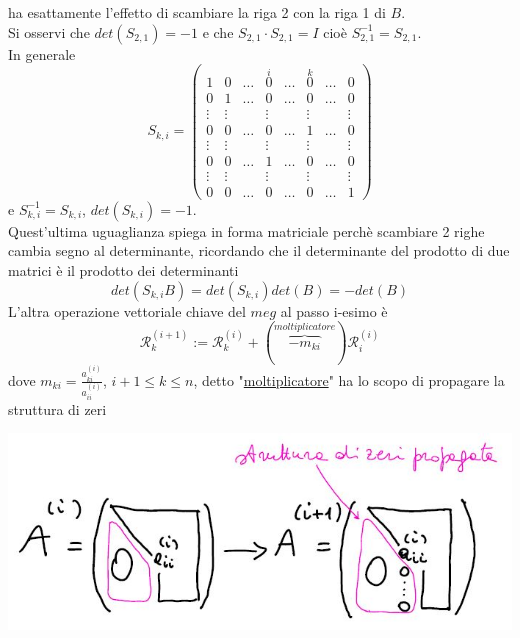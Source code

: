 \documentclass[12pt,a4paper]{article}
\begin{document}
ha esattamente l'effetto di scambiare la riga 2 con la riga 1 di $B$.\\Si osservi che $det(S_{2,1})=-1$ e che $S_{2,1}\cdot S_{2,1}= I$ cioè $S_{2,1}^{-1}=S_{2,1}$.\\
In generale
\begin{equation*}
    S_{k,i}=\begin{pmatrix}
        1 & 0 & \dots & \overset{i}{0} & \dots & \overset{k}{0} & \dots & 0 \\
        0 & 1 & \dots & 0 & \dots & 0 & \dots & 0 \\
        \vdots & \vdots &  & \vdots &  & \vdots &  & \vdots \\
        0 & 0 & \dots & 0 & \dots & 1 & \dots & 0 \\
        \vdots & \vdots &  & \vdots &  & \vdots &  & \vdots \\
        0 & 0 & \dots & 1 & \dots & 0 & \dots & 0 \\
        \vdots & \vdots &  & \vdots &  & \vdots &  & \vdots \\
        0 & 0 & \dots & 0 & \dots & 0 & \dots & 1
    \end{pmatrix}
\end{equation*}
e \quad $S^{-1}_{k,i}=S_{k,i}$, \quad   $det(S_{k,i})=-1$.\\Quest'ultima uguaglianza spiega in forma matriciale perchè scambiare 2 righe cambia segno al determinante, ricordando che il determinante del prodotto di due matrici è il prodotto dei determinanti 
\begin{equation*}
    det(S_{k,i}B)=det(S_{k,i})det(B)=-det(B)
\end{equation*}
L'altra operazione vettoriale chiave del $meg$ al passo i-esimo è
\begin{equation*}
    \mathcal{R}^{(i+1)}_k:=\mathcal{R}^{(i)}_k+(\overbrace{-m_{ki}}^{moltiplicatore})\mathcal{R}^{(i)}_i
\end{equation*}
dove $m_{ki}=\frac{a_{ki}^{(i)}}{a_{ii}^{(i)}}$, $i+1\leq k\leq n$, detto "\underline{moltiplicatore}" ha lo scopo di propagare la struttura di zeri
\begin{center}
    \includegraphics[scale=0.5]{calcolo.JPG}    
\end{center}
\end{document}
